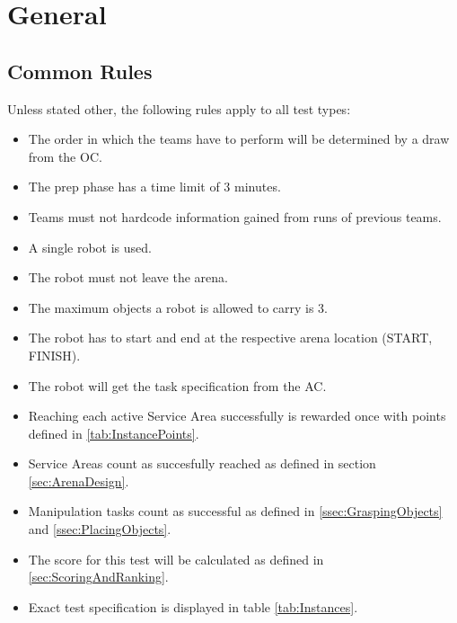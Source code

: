 \label{sec:Tests}

\section{General}

\subsection{Common Rules}
\label{ssec: Common Rules}


Unless stated other, the following rules apply to all test types:

\begin{itemize}
\item The order in which the teams have to perform will be determined by a draw from the OC.
\item The prep phase has a time limit of 3 minutes.
\item Teams must not hardcode information gained from runs of previous teams.
\item A single robot is used.
\item The robot must not leave the arena.
\item The maximum objects a robot is allowed to carry is 3.
\item The robot has to start and end at the respective arena location (START, FINISH).
\item The robot will get the task specification from the AC.
\item Reaching each active Service Area successfully is rewarded once with points defined in \ref{tab:InstancePoints}.
\item Service Areas count as succesfully reached as defined in section \ref{sec:ArenaDesign}.
\item Manipulation tasks count as successful as defined in \ref{ssec:GraspingObjects} and \ref{ssec:PlacingObjects}.
\item The score for this test will be calculated as defined in \ref{sec:ScoringAndRanking}.
\item Exact test specification is displayed in table \ref{tab:Instances}.
\end{itemize}






